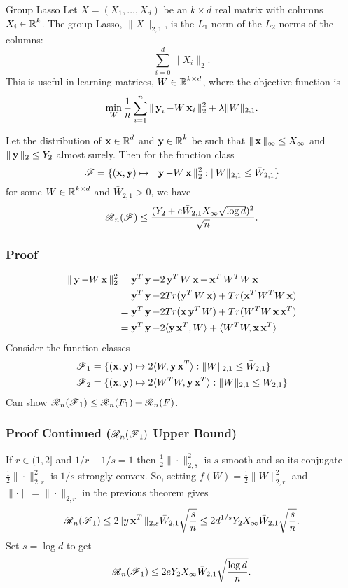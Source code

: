 

\begin{frame}{Group Lasso}
Let  $X = (X_1, \dots, X_d)$ be an $k \times d$ real matrix with columns
$X_i \in \R^k$. The group Lasso, $\|X\|_{2,1}$, is the $L_1$-norm of the $L_2$-norms of
the columns:
\[\sum_{i = 0}^d \|X_i\|_2.\]
This is useful in learning matrices, $W \in \R^{k \times d}$, where the objective function is
\[ \min_W \frac{1}{n} \sum_{i=1}^n \|\y_i - W\x_i\|_2^2 + \lambda \|W\|_{2,1}.\]
\end{frame}


\begin{frame}
\begin{theorem}
Let the distribution of $\x \in \R^d$ and $\y \in \R^k$ be such that
$\|\x\|_\infty \le X_\infty$ and $\|\y\|_2 \le Y_2$ almost surely.
Then for the function class
\[\F = \{(\x, \y) \mapsto \|\y - W\x\|_2^2 : \|W\|_{2,1} \le \bar{W}_{2,1}\}\]
for some $W \in \R^{k \times d}$ and $\bar{W}_{2,1} > 0$, we have
\[\Rad_n(\F) \le \frac{(Y_2 + e\bar{W}_{2,1} X_\infty \sqrt{\log d})^2}{\sqrt{n}}.\]
\end{theorem}
\end{frame}


\begin{frame}
\frametitle{Proof}
\begin{align*}
\|\y - W\x\|_2^2 &= \y^T \y - 2 \y^T W \x + \x^T W^T W \x \\
   &= \y^T \y - 2 Tr(\y^T W \x) + Tr(\x^T W^T W \x) \\
   &= \y^T \y - 2 Tr(\x \y^T W) + Tr(W^T W \x \x^T) \\
   &= \y^T \y - 2\langle \y \x^T, W\rangle + \langle W^TW, \x \x^T\rangle
\end{align*}
Consider the function classes
\begin{align*}
\F_1 &= \{(\x, \y) \mapsto 2\langle W, \y\x^T\rangle : \|W\|_{2,1} \le \bar{W}_{2,1}\} \\
\F_2 &= \{(\x, \y) \mapsto 2\langle W^T W, \y\x^T\rangle : \|W\|_{2,1} \le \bar{W}_{2,1}\}
\end{align*}
Can show $\Rad_n(\F_1) \le \Rad_n(F_1) + \Rad_n(F)$.
\end{frame}


\begin{frame}
\frametitle{Proof Continued ($\Rad_n(\F_1)$ Upper Bound)}
If $r \in (1,2]$ and $1/r + 1/s = 1$ then $\frac{1}{2} \| \cdot \|_{2,s}^2$ is $s$-smooth and so
its conjugate $\frac{1}{2}\| \cdot \|_{2,r}^2$ is $1/s$-strongly convex. So,
setting $f(W) = \frac{1}{2}\|W\|_{2,r}^2$ and $\| \cdot \| = \| \cdot \|_{2,r}$ in 
the previous theorem gives
\[\Rad_n(\F_1) \le 2\|y\x^T\|_{2,s}\bar{W}_{2,1}\sqrt{\frac{s}{n}} \le 
   2d^{1/s}Y_2X_\infty \bar{W}_{2,1}\sqrt{\frac{s}{n}}.\]
Set $s = \log d$ to get
\[\Rad_n(\F_1) \le 2eY_2X_\infty \bar{W}_{2,1}\sqrt{\frac{\log d}{n}}.\]
\end{frame}


